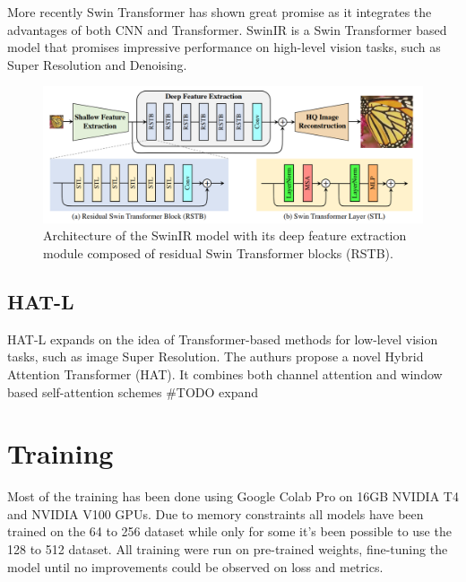 More recently Swin Transformer\cite{liu2021swin}  has shown great promise as it integrates the advantages of both CNN and
Transformer. SwinIR\cite{liang2021swinir} is a Swin Transformer based model that promises impressive performance on high-level vision tasks, such as Super Resolution and Denoising.

\begin{figure}[H]
  \centering
  \includegraphics[scale=0.35]{figures/SwinIR.png}
  \caption{Architecture of the SwinIR model with its deep feature extraction module composed of residual Swin Transformer blocks (RSTB).}
  \label{img:swinir}
\end{figure}

\subsection{HAT-L}
\label{subsec:hatl}

HAT-L expands on the idea of Transformer-based methods for low-level vision tasks, such as image Super Resolution. The authurs propose a novel Hybrid Attention Transformer (HAT). It combines both channel attention and window based self-attention schemes \#TODO expand

\section{Training}
\label{sec:Training}

Most of the training has been done using Google Colab Pro on 16GB NVIDIA T4 and NVIDIA V100 GPUs. Due to memory constraints all models have been trained on the 64 to 256 dataset while only for some it's been possible to use the 128 to 512 dataset.
All training were run on pre-trained weights, fine-tuning the model until no improvements could be observed on loss and metrics.

